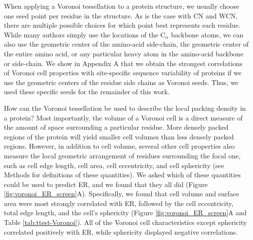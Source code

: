 \documentclass[12pt]{article}
\begin{document}
When applying a Voronoi tessellation to a protein structure, we usually choose one seed point per residue in the structure. As is the case with CN and WCN, there are multiple possible choices for which point best represents each residue. While many authors simply use the locations of the C$_\alpha$ backbone atoms, we can also use the geometric center of the amino-acid side-chain, the geometric center of the entire amino acid, or any particular heavy atom in the amino-acid backbone or side-chain. We show in Appendix A that we obtain the strongest correlations of Voronoi cell properties with site-specific sequence variability of proteins if we use the geometric centers of the residue side chains as Voronoi seeds. Thus, we used these specific seeds for the remainder of this work.

How can the Voronoi tessellation be used to describe the local packing density in a protein? Most importantly, the volume of a Voronoi cell is a direct measure of the amount of space surrounding a particular residue. More densely packed regions of the protein will yield smaller cell volumes than less densely packed regions. However, in addition to cell volume, several other cell properties also measure the local geometric arrangement of residues surrounding the focal one, such as cell edge length, cell area, cell eccentricity, and cell sphericity (see Methods for definitions of these quantities). We asked which of these quantities could be used to predict ER, and we found that they all did (Figure \ref{fig:voronoi_ER_screen}A). Specifically, we found that cell volume and surface area were most strongly correlated with ER, followed by the cell eccentricity, total edge length, and the cell's sphericity (Figure \ref{fig:voronoi_ER_screen}A and Table \ref{tab:ttest-Voronoi}). All of the Voronoi cell characteristics except sphericity correlated positively with ER, while sphericity displayed negative correlations.
\end{document}
